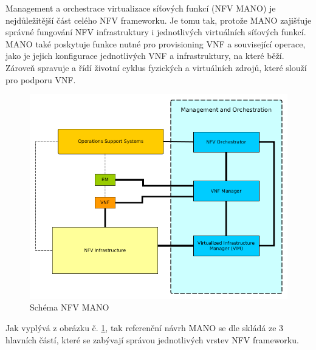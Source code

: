 Management a orchestrace virtualizace síťových funkcí (NFV MANO) je nejdůležitější část celého NFV frameworku. Je tomu tak, protože MANO zajišťuje správné fungování NFV infrastruktury i jednotlivých virtuálních síťových funkcí. MANO také poskytuje funkce nutné pro provisioning VNF a související operace, jako je jejich konfigurace jednotlivých VNF a infrastruktury, na které běží. Zároveň spravuje a řídí životní cyklus fyzických a virtuálních zdrojů, které slouží pro podporu VNF. 

\begin{figure}[h]
\begin{centering}
\includegraphics[scale=0.65]{images/MANO}
\par\end{centering}
\caption{Schéma NFV MANO\label{fig:MANO}}
\end{figure}

Jak vyplývá z obrázku č. \ref{fig:MANO}, tak referenční návrh MANO se dle \cite{NFV_MANO} skládá ze 3 hlavních částí, které se zabývají správou jednotlivých vrstev NFV frameworku.

